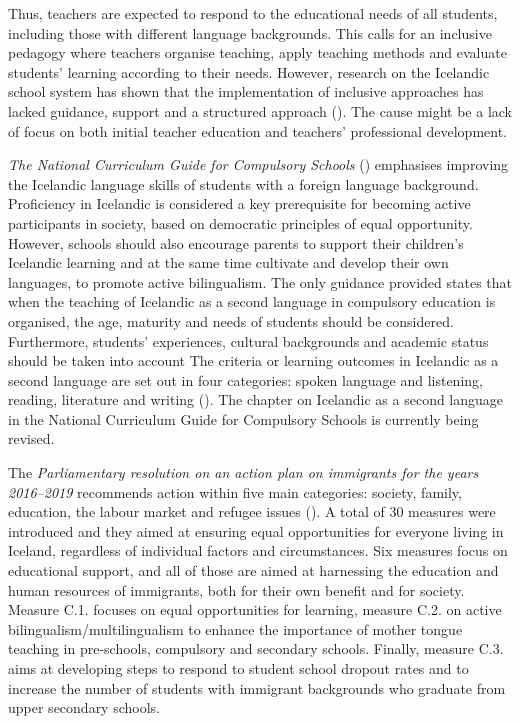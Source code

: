 \documentclass[output=paper]{langscibook}
\begin{document}
Thus, teachers are expected to respond to the educational needs of all students, including those with different language backgrounds. This calls for an inclusive pedagogy where teachers organise teaching, apply teaching methods and evaluate students’ learning according to their needs. However, research on the Icelandic school system has shown that the implementation of inclusive approaches  has lacked guidance, support and a structured approach (\citealt{European_agency_for_special_needs_and_inclusive_education2011}). The cause might be a lack of focus on both initial teacher education and teachers’ professional development.

\textit{The National Curriculum Guide for Compulsory Schools} (\citealt{Ministry_of_education_science_and_culture2011}) emphasises improving the Icelandic language skills of students with a foreign language background. Proficiency in Icelandic is considered a key prerequisite for becoming active participants in society, based on democratic principles of equal opportunity.  However, schools should also encourage parents to support their children’s Icelandic learning and at the same time cultivate and develop their own languages, to promote active bilingualism. The only guidance provided states that when the teaching of Icelandic as a second language in compulsory education is organised, the age, maturity and needs of students should be considered. Furthermore, students’ experiences, cultural backgrounds and academic status should be taken into account The criteria or learning outcomes in Icelandic as a second language are set out in four categories: spoken language and listening, reading, literature and writing (\citealt{Ministry_of_education_science_and_culture2013}). The chapter on Icelandic as a second language in the National Curriculum Guide for Compulsory Schools is currently being revised.

The \textit{Parliamentary resolution on an action plan on immigrants for the years 2016–2019} recommends action within five main categories: society, family, education, the labour market and refugee issues (\citealt{Alingi2016}). A total of 30 measures were introduced and they aimed at ensuring equal opportunities for everyone living in Iceland, regardless of individual factors and circumstances. Six measures focus on educational support, and all of those are aimed at harnessing the education and human resources of immigrants, both for their own benefit and for society. Measure C.1. focuses on equal opportunities for learning, measure C.2. on active bilingualism/multilingualism to enhance the importance of mother tongue teaching in pre-schools, compulsory and secondary schools. Finally, measure C.3. aims at developing steps to respond to student school dropout rates and to increase the number of students with immigrant backgrounds who graduate from upper secondary schools.  
\end{document}
